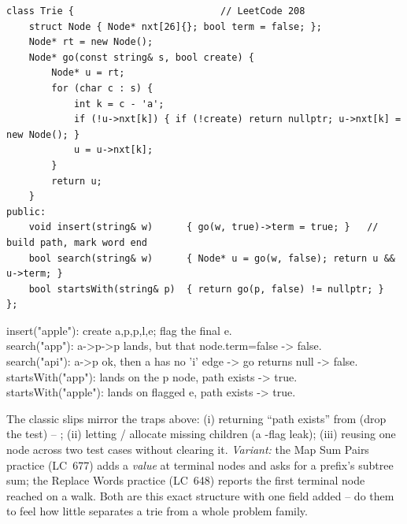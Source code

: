 \begin{lstlisting}[caption={LeetCode 208 -- the Trie class, three operations over one walk}, label={lst:c08-implement-soln}]
class Trie {                          // LeetCode 208
    struct Node { Node* nxt[26]{}; bool term = false; };
    Node* rt = new Node();
    Node* go(const string& s, bool create) {
        Node* u = rt;
        for (char c : s) {
            int k = c - 'a';
            if (!u->nxt[k]) { if (!create) return nullptr; u->nxt[k] = new Node(); }
            u = u->nxt[k];
        }
        return u;
    }
public:
    void insert(string& w)      { go(w, true)->term = true; }   // build path, mark word end
    bool search(string& w)      { Node* u = go(w, false); return u && u->term; }
    bool startsWith(string& p)  { return go(p, false) != nullptr; }
};
\end{lstlisting}

\begin{tracebox}
insert("apple"): create a,p,p,l,e; flag the final e.\\
search("app"): a->p->p lands, but that node.term=false -> false.\\
search("api"): a->p ok, then a has no 'i' edge -> go returns null -> false.\\
startsWith("app"): lands on the p node, path exists -> true.\\
startsWith("apple"): lands on flagged e, path exists -> true.
\end{tracebox}


\begin{warningbox}
The classic slips mirror the traps above: (i) returning ``path exists'' from  (drop the
 test) -- \re; (ii) letting / allocate missing children (a
-flag leak); (iii) reusing one node across two test cases without clearing it. \emph{Variant:}
the Map Sum Pairs practice (LC~677) adds a \emph{value} at terminal nodes and asks for a prefix's subtree
sum; the Replace Words practice (LC~648) reports the first terminal node reached on a walk. Both are this exact
structure with one field added -- do them to feel how little separates a trie from a whole problem family.
\end{warningbox}

